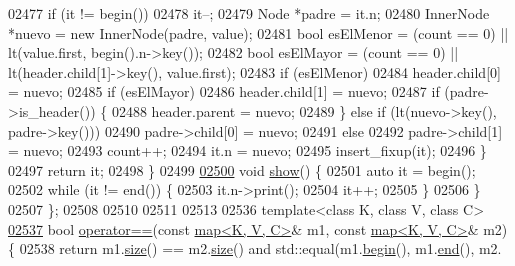 \begin{DoxyCode}
02477             \textcolor{keywordflow}{if} (it != begin())
02478                 it--;
02479             Node *padre = it.n;
02480             InnerNode *nuevo = \textcolor{keyword}{new} InnerNode(padre, value);
02481             \textcolor{keywordtype}{bool} esElMenor = (count == 0) || lt(value.first, begin().n->key());
02482             \textcolor{keywordtype}{bool} esElMayor = (count == 0) || lt(header.child[1]->key(), value.first);
02483             \textcolor{keywordflow}{if} (esElMenor)
02484                 header.child[0] = nuevo;
02485             \textcolor{keywordflow}{if} (esElMayor)
02486                 header.child[1] = nuevo;
02487             \textcolor{keywordflow}{if} (padre->is\_header()) \{
02488                 header.parent = nuevo;
02489             \} \textcolor{keywordflow}{else} \textcolor{keywordflow}{if} (lt(nuevo->key(), padre->key()))
02490                 padre->child[0] = nuevo;
02491             \textcolor{keywordflow}{else}
02492                 padre->child[1] = nuevo;
02493             count++;
02494             it.n = nuevo;
02495             insert\_fixup(it);
02496         \}
02497         \textcolor{keywordflow}{return} it;
02498     \}
02499 
\hyperlink{classaed2_1_1map_a98aadc6fb2ac8f51567a98473a90c30f_a98aadc6fb2ac8f51567a98473a90c30f}{02500}     \textcolor{keywordtype}{void} \hyperlink{classaed2_1_1map_a98aadc6fb2ac8f51567a98473a90c30f_a98aadc6fb2ac8f51567a98473a90c30f}{show}() \{
02501         \textcolor{keyword}{auto} it = begin();
02502         \textcolor{keywordflow}{while} (it != end()) \{
02503             it.n->print();
02504             it++;
02505         \}
02506     \}
02507 \};
02508 
02510 
02511 
02513 
02536 \textcolor{keyword}{template}<\textcolor{keyword}{class} K, \textcolor{keyword}{class} V, \textcolor{keyword}{class} C>
\hyperlink{classaed2_1_1map_abfc51b39670220e79037ac067006e933_abfc51b39670220e79037ac067006e933}{02537} \textcolor{keywordtype}{bool} \hyperlink{classaed2_1_1map_abfc51b39670220e79037ac067006e933_abfc51b39670220e79037ac067006e933}{operator==}(\textcolor{keyword}{const} \hyperlink{classaed2_1_1map}{map<K, V, C>}& m1, \textcolor{keyword}{const} \hyperlink{classaed2_1_1map}{map<K, V, C>}& m2) \{
02538     \textcolor{keywordflow}{return} m1.\hyperlink{classaed2_1_1map_aa6e806b3be6dc0da79adbfae08b571bf_aa6e806b3be6dc0da79adbfae08b571bf}{size}() == m2.\hyperlink{classaed2_1_1map_aa6e806b3be6dc0da79adbfae08b571bf_aa6e806b3be6dc0da79adbfae08b571bf}{size}() and std::equal(m1.\hyperlink{classaed2_1_1map_a58a95705d54b3dda7f775ce5a22225cb_a58a95705d54b3dda7f775ce5a22225cb}{begin}(), m1.\hyperlink{classaed2_1_1map_a76023e6a56cb625513e1b5ea028bf983_a76023e6a56cb625513e1b5ea028bf983}{end}(), m2.

\end{DoxyCode}
